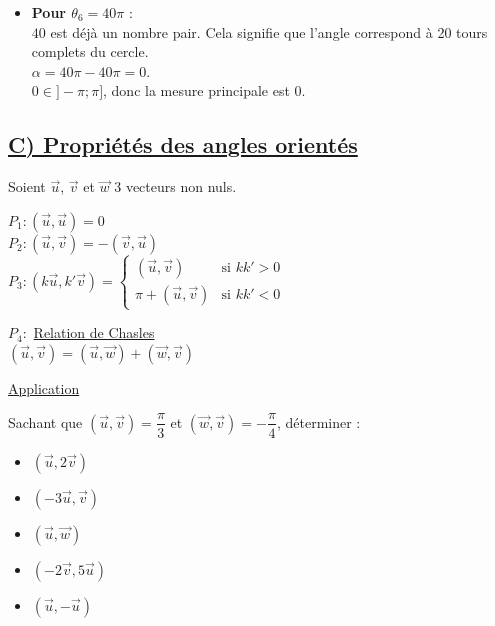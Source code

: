 \documentclass[12pt,a4paper]{article}
\begin{document}
\begin{itemize}
    \vspace{1em}

    \item[f)] \textbf{Pour $\theta_6 = 40\pi$} :
    \\ $40$ est déjà un nombre pair. Cela signifie que l'angle correspond à 20 tours complets du cercle.
    \\ $\alpha = 40\pi - 40\pi = 0$.
    \\ $0 \in ]-\pi ; \pi]$, donc la mesure principale est \textbf{$0$}.
\end{itemize}


\subsection*{%
    \color{monRouge} \underline{C) Propriétés des angles orientés}%
}
Soient $\vec{u}$, $\vec{v}$ et $\vec{w}$ 3 vecteurs non nuls.

\vspace{1em}

\noindent $P_1 : (\vec{u}, \vec{u}) = 0$ \\
$P_2 : (\vec{u}, \vec{v}) = -(\vec{v}, \vec{u})$ \\
$P_3 : (k\vec{u}, k'\vec{v}) = \begin{cases} (\vec{u}, \vec{v}) & \text{si } kk' > 0 \\ \pi + (\vec{u}, \vec{v}) & \text{si } kk' < 0 \end{cases}$

\vspace{1em}

\noindent \textcolor{monRouge}{$P_4 :$ \underline{Relation de Chasles}} \\
$(\vec{u}, \vec{v}) = (\vec{u}, \vec{w}) + (\vec{w}, \vec{v})$

\begin{center}
    \textcolor{monRouge}{\underline{\Large Application}}
\end{center}

\noindent Sachant que $(\vec{u}, \vec{v}) = \dfrac{\pi}{3}$ et $(\vec{w}, \vec{v}) = -\dfrac{\pi}{4}$, déterminer :

\begin{itemize}
    \item[a)] $(\vec{u}, 2\vec{v})$
    \item[b)] $(-3\vec{u}, \vec{v})$
    \item[c)] $(\vec{u}, \vec{w})$
    \item[d)] $(-2\vec{v}, 5\vec{u})$
    \item[e)] $(\vec{u}, -\vec{u})$
\end{itemize}
\end{document}
